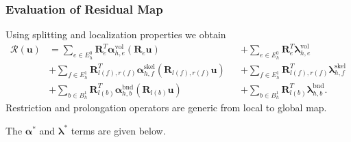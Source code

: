 \begin{frame}
\frametitle<presentation>{Evaluation of Residual Map}
Using splitting and localization properties we obtain
\begin{align*}
\mathcal{R}(\mathbf{u}) 
&= \sum_{e\in E^0_h} \mathbf{R}_e^T\bm{\alpha}^\text{vol}_{h,e}(\mathbf{R}_e\mathbf{u}) 
&&+ \sum_{e\in E^0_h} \mathbf{R}_e^T\bm{\lambda}^\text{vol}_{h,e} \\
&+ \sum_{f\in E^1_h}
\mathbf{R}_{l(f),r(f)}^T\bm{\alpha}^\text{skel}_{h,f}(\mathbf{R}_{l(f),r(f)}\mathbf{u}) 
&&+ \sum_{f\in E^1_h} \mathbf{R}_{l(f),r(f)}^T\bm{\lambda}^\text{skel}_{h,f}\\
&+ \sum_{b\in B^1_h} \mathbf{R}_{l(b)}^T\bm{\alpha}^\text{bnd}_{h,b}(\mathbf{R}_{l(b)}\mathbf{u})
&&+ \sum_{b\in B^1_h} \mathbf{R}_{l(b)}^T\bm{\lambda}^\text{bnd}_{h,b}.
\end{align*}
Restriction and prolongation operators are generic from local to global map.
\end{frame}

The $\bm{\alpha}^\ast$ and $\bm{\lambda}^\ast$ terms are given below.

